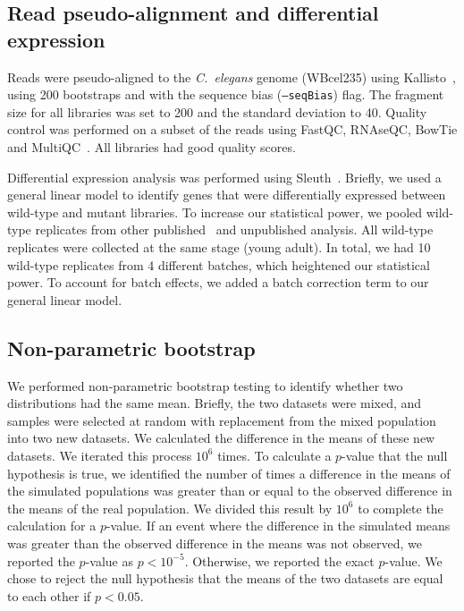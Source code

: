 \documentclass[10pt, twocolumn]{article}
\newcommand{\cel}{\emph{C.~elegans}}
\begin{document}
\subsection*{Read pseudo-alignment and differential expression}
Reads were pseudo-aligned to the \cel{} genome (WBcel235) using
Kallisto~\cite{Bray2016}, using 200 bootstraps and with the sequence bias
(\texttt{--seqBias}) flag. The fragment size for all libraries was set to 200
and the standard deviation to 40. Quality control was performed on a subset of
the reads using FastQC, RNAseQC, BowTie and
MultiQC~\cite{Andrews2010,Deluca2012,Langmead2009,Ewels2016}. All libraries had
good quality scores.

Differential expression analysis was performed using
Sleuth~\cite{Pimentel2016a}. Briefly, we used a general linear model to identify
genes that were differentially expressed between wild-type and mutant libraries.
To increase our statistical power, we pooled wild-type replicates from other
published~\cite{} and unpublished analysis. All wild-type replicates were
collected at the same stage (young adult). In total, we had 10 wild-type
replicates from 4 different batches, which heightened our statistical
power. To account for batch effects, we added a batch correction term to our
general linear model.

\subsection*{Non-parametric bootstrap}
We performed non-parametric bootstrap testing to identify whether two
distributions had the same mean. Briefly, the two datasets were mixed, and
samples were selected at random with replacement from the mixed population into
two new datasets. We calculated the difference in the means of these new
datasets. We iterated this process $10^6$ times. To calculate a $p$-value that
the null hypothesis is true, we identified the number of times a difference in
the means of the simulated populations was greater than or equal to the observed
difference in the means of the real population. We divided this result by $10^6$
to complete the calculation for a $p$-value. If an event where the difference in
the simulated means was greater than the observed difference in the means was
not observed, we reported the $p$-value as $p<10^{-5}$. Otherwise, we reported
the exact $p$-value. We chose to reject the null hypothesis that the means of
the two datasets are equal to each other if $p < 0.05$.
\end{document}
